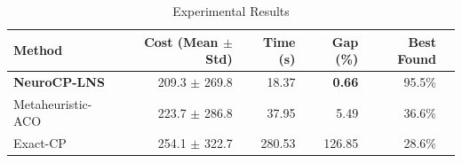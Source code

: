 \begin{table}[ht]
\centering
\caption{Experimental Results}
\label{tab:results}
\begin{tabular}{lrrrrr}
\toprule
Method & Cost (Mean $\pm$ Std) & Time (s) & Gap (\%) & Best Found \\
\midrule
\textbf{NeuroCP-LNS} & 209.3 $\pm$ 269.8 & 18.37 & \textbf{0.66} & 95.5\% \\
Metaheuristic-ACO & 223.7 $\pm$ 286.8 & 37.95 & 5.49 & 36.6\% \\
Exact-CP & 254.1 $\pm$ 322.7 & 280.53 & 126.85 & 28.6\% \\
\bottomrule
\end{tabular}
\end{table}
